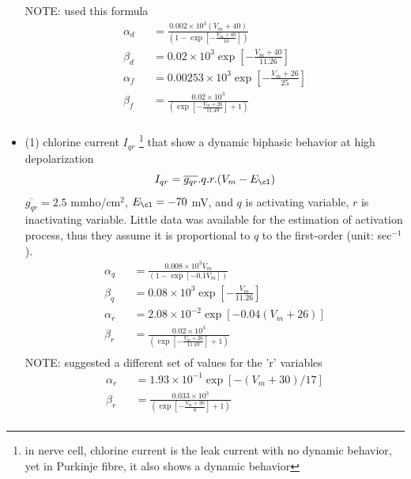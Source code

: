 \begin{itemize}
NOTE: \citep{adrian1970} used this formula
    \begin{eqnarray*}
      \alpha_d &&= \frac{0.002 \times
      10^3 (V_m+40)}{(1-\exp[-\frac{V_m+40}{10}])}
      \\
  \beta_d &&= 0.02\times 10^3 \exp [-\frac{V_m + 40}{11.26}] \\
  \alpha_f &&= 0.00253 \times 10^3 \exp [-\frac{V_m + 26}{25}] \\
  \beta_f &&= \frac{0.02 \times 10^3}{(\exp [- \frac{V_m + 26}{11.49}] + 1)} \\
    \end{eqnarray*}

\item (1) chlorine current $I_{qr}$
  \footnote{in nerve cell, chlorine current is the leak current with
    no dynamic behavior, yet in Purkinje fibre, it also shows a dynamic
    behavior} that show a dynamic biphasic behavior at high depolarization
  \begin{equation}
    \label{eq:611}
    I_{qr} = \overline{g_{qr}} .q.r.(V_m-E_{\cl})
  \end{equation}
  $\overline{g_{qr}}=2.5$ mmho/cm$^2$, $E_{\cl}=-70$ mV, and $q$ is
  activating variable, $r$ is inactivating variable. Little data was
  available for the estimation of activation process, thus they assume
  it is proportional to $q$ to the first-order (unit: sec$^{-1}$).
\begin{eqnarray}
  \alpha_q &&= \frac{0.008\times 10^3 V_m}{(1-\exp[-0.1 V_m])} \\
  \beta_q &&= 0.08 \times 10^3 \exp[- \frac{V_m}{11.26}] \\
  \alpha_r &&= 2.08\times 10^{-2} \exp[-0.04(V_m + 26)] \\
  \beta_r &&= \frac{0.02\times 10^3}{(\exp[ -\frac{V_m + 26}{11.49}] +1)} \\
\end{eqnarray}
NOTE: \citep{fozzard1973} suggested a different set of values for the 'r'
variables
\begin{eqnarray*}
  \alpha_r &&= 1.93\times 10^{-1} \exp[-(V_m + 30)/17] \\
  \beta_r &&= \frac{0.033\times 10^3}{(\exp[ -\frac{V_m + 30}{8}] +1)} \\
\end{eqnarray*} 


\end{itemize}
